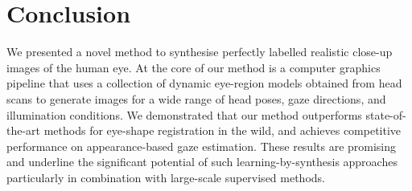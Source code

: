 
\section{Conclusion}


We presented a novel method to synthesise perfectly labelled realistic close-up images of the human eye.
At the core of our method is a computer graphics pipeline that uses a collection of dynamic eye-region models obtained from head scans to generate images for a wide range of head poses, gaze directions, and illumination conditions.
We demonstrated that our method outperforms state-of-the-art methods for eye-shape registration in the wild, and achieves competitive performance on appearance-based gaze estimation.
These results are promising and underline the significant potential of such learning-by-synthesis approaches particularly in combination with large-scale supervised methods.